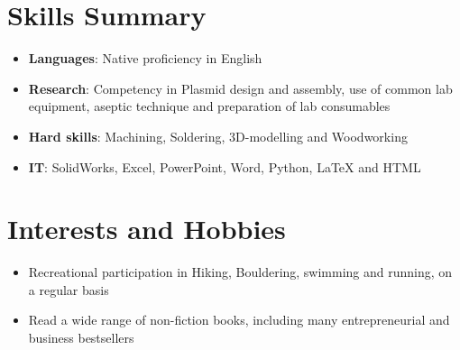 \documentclass[letterpaper,10.8pt]{article}
\newcommand{\resumeItemListStart}{\begin{justify}\begin{itemize}[leftmargin=3ex, rightmargin=2ex, noitemsep,labelsep=1.2mm,itemsep=0mm]\small}
\newcommand{\resumeItemListEnd}{\end{itemize}\end{justify}\vspace{-2mm}}
\begin{document}
\section{\textbf{Skills Summary}}
    \resumeItemListStart
     \item {\textbf{Languages}{: Native proficiency in English }}\\
     \vspace{-10pt}
    \item{ \textbf{Research}{: Competency in Plasmid design and assembly, use of common lab equipment, aseptic technique and preparation of lab consumables}} \\
     \vspace{-10pt}
      \item{ \textbf{Hard skills}{: Machining, Soldering, 3D-modelling and Woodworking}} \\
    \vspace{-10pt}
     \item{ \textbf{IT}{: SolidWorks, Excel, PowerPoint, Word, Python, LaTeX and HTML}} \\
      \vspace{-10pt}
 \resumeItemListEnd 
 \vspace{-16pt}

\section{\textbf{Interests and Hobbies}}
 \resumeItemListStart
     \item{Recreational participation in Hiking, Bouldering, swimming and running, on a regular basis} \\
      \vspace{-10pt}
      \item{Read a wide range of non-fiction books, including many entrepreneurial and business bestsellers} \\
   \vspace{-10pt}
 \resumeItemListEnd 
 \vspace{-5mm}

\end{document}
